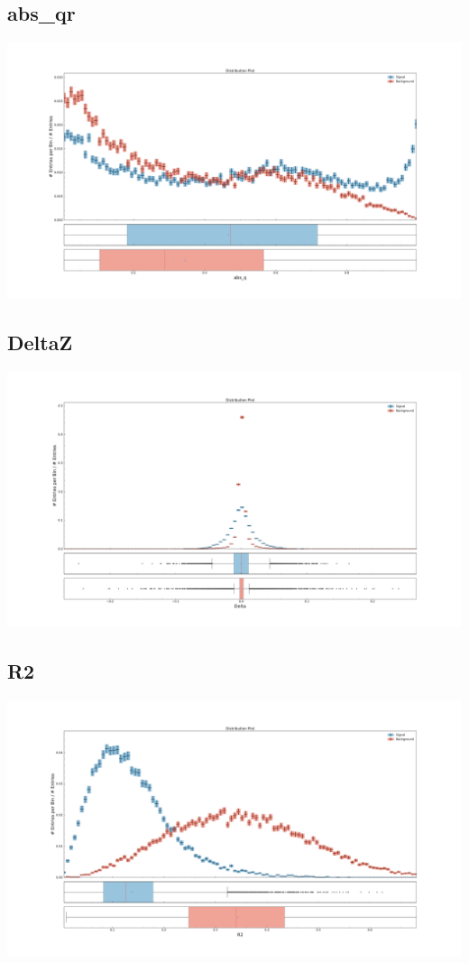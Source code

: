 \documentclass[10pt,a4paper]{article}
\begin{document}
\subsection{abs\_qr}
\begin{center}
\includegraphics[width=1.0\textwidth]{variable_7565637163324965417.pdf}
\end{center}
\subsection{DeltaZ}
\begin{center}
\includegraphics[width=1.0\textwidth]{variable_-6872944916743380479.pdf}
\end{center}
\subsection{R2}
\begin{center}
\includegraphics[width=1.0\textwidth]{variable_7345058823840298118.pdf}
\end{center}
\raggedbottom
\pagebreak[0]
\FloatBarrier
\end{document}
